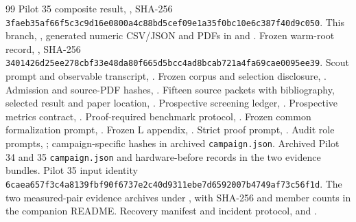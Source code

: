 \documentclass[10pt,a4paper]{article}
\begin{document}
\clearpage
\begin{thebibliography}{99}\footnotesize\RaggedRight\setlength{\itemsep}{0pt}\setlength{\parskip}{0pt}
 Pilot 35 composite result, , SHA-256 \texttt{3faeb35af66f5c3c9d16e0800a4c88bd5cef09e1a35f0bc10e6c387f40d9c050}.
 This branch, , generated numeric CSV/JSON and PDFs in  and .
 Frozen warm-root record, , SHA-256 \texttt{3401426d25ee278cbf33e48da80f665d5bcc4ad8bcab721a4fa69cae0095ee39}.
 Scout prompt and observable transcript, .
 Frozen corpus and selection disclosure, .
 Admission and source-PDF hashes, .
 Fifteen source packets with bibliography, selected result and paper location, .
 Prospective screening ledger, .
 Prospective metrics contract, .
 Proof-required benchmark protocol, .
 Frozen common formalization prompt, .
 Frozen L appendix, .
 Strict proof prompt, .
 Audit role prompts, ; campaign-specific hashes in archived \texttt{campaign.json}.
 Archived Pilot 34 and 35 \texttt{campaign.json} and hardware-before records in the two evidence bundles. Pilot 35 input identity \texttt{6caea657f3c4a8139fbf90f6737e2c40d9311ebe7d6592007b4749af73c56f1d}.
 The two measured-pair evidence archives under , with SHA-256 and member counts in the companion README.
 Recovery manifest and incident protocol,  and .

\end{thebibliography}
\end{document}
